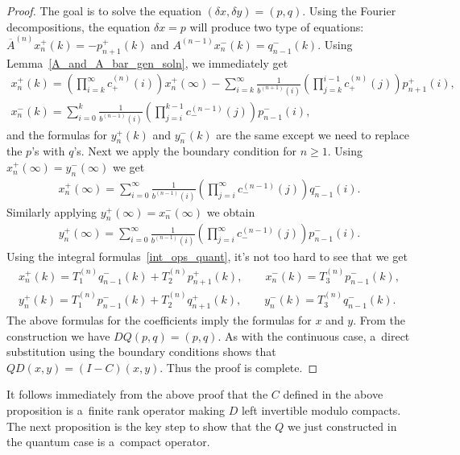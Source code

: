 \documentclass[pdftex]{sigma}
\numberwithin{equation}{section}
\begin{document}
\begin{proof}
The goal is to solve the equation $(\delta x, \delta y) = (p,q)$.
Using the Fourier decompositions, the equation $\delta x = p$ will produce two type of equations:
$\overline{A}^{(n)}x_n^+(k) = -p_{n+1}^+(k)$ and $A^{(n-1)}x_n^-(k) = q_{n-1}^-(k)$.
Using Lemma~\ref{A_and_A_bar_gen_soln}, we immediately get
\begin{gather*}
x_n^+(k) = \left(\prod\limits_{i=k}^\infty c_+^{(n)}(i)\right)x_n^+(\infty) -
\sum\limits_{i=k}^\infty\frac{1}{b^{(n+1)}(i)}\left(\prod\limits_{j=k}^{i-1}c_+^{(n)}(j)\right)p_{n+1}^+(i),
\\
x_n^-(k) = \sum\limits_{i=0}^k \frac{1}{b^{(n-1)}(i)}\left(\prod\limits_{j=i}^{k-1} c_-^{(n-1)}(j)\right)p_{n-1}^-(i),
\end{gather*}
and the formulas for $y_n^+(k)$ and $y_n^-(k)$ are the same except we need to replace the $p$'s with $q$'s.
Next we apply the boundary condition for $n\ge 1$.
Using $x_n^+(\infty) = y_n^-(\infty)$ we get
\begin{gather*}
x_n^+(\infty) = \sum\limits_{i=0}^\infty \frac{1}{b^{(n-1)}(i)}\left(\prod\limits_{j=i}^\infty
c_-^{(n-1)}(j)\right)q_{n-1}^-(i).
\end{gather*}
Similarly applying $y_n^+(\infty) = x_n^-(\infty)$ we obtain
\begin{gather*}
y_n^+(\infty) = \sum\limits_{i=0}^\infty \frac{1}{b^{(n-1)}(i)}\left(\prod\limits_{j=i}^\infty
c_-^{(n-1)}(j)\right)p_{n-1}^-(i).
\end{gather*}
Using the integral formulas~\eqref{int_ops_quant}, it's not too hard to see that we get
\begin{gather*}
x_n^+(k) = T_1^{(n)}q_{n-1}^-(k) + T_2^{(n)}p_{n+1}^+(k),
\qquad
x_n^-(k) = T_3^{(n)}p_{n-1}^-(k),
\\
y_n^+(k) = T_1^{(n)}p_{n-1}^-(k) + T_2^{(n)}q_{n+1}^+(k),
\qquad
y_n^-(k) = T_3^{(n)}q_{n-1}^-(k).
\end{gather*}
The above formulas for the coef\/f\/icients imply the formulas for ${x}$ and ${y}$.
From the construction we have $DQ(p,q)=(p,q)$.
As with the continuous case, a~direct substitution using the boundary conditions shows that $QD(x,y) = (I-C)(x,y)$.
Thus the proof is complete.
\end{proof}

It follows immediately from the above proof that the $C$ def\/ined in the above proposition is a~f\/inite rank operator
making $D$ left invertible modulo compacts.
The next proposition is the key step to show that the $Q$ we just constructed in the quantum case is a~compact operator.
\end{document}
